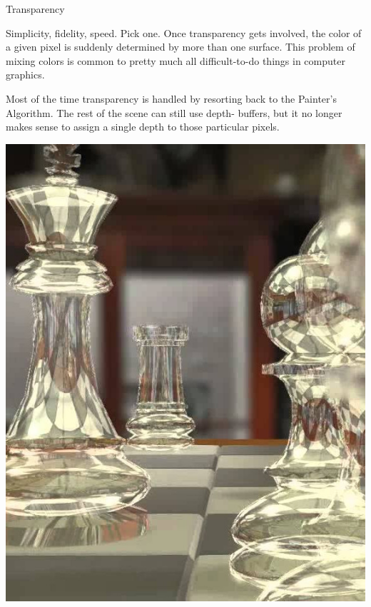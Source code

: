 \documentclass{lug}
\newcommand{\splitslide}[4]{
    \noindent
    \begin{minipage}{#1 \textwidth - #2 }
        #3
    \end{minipage}%
    \hspace{ \dimexpr #2 * 2 \relax }%
    \begin{minipage}{\textwidth - #1 \textwidth - #2 }
        #4
    \end{minipage}
}
\begin{document}
\begin{frame}{Transparency}
    \splitslide{0.65}{.7em}{
        \small

        Simplicity, fidelity, speed. Pick one. Once transparency gets
        involved, the color of a given pixel is suddenly determined by more
        than one surface. This problem of mixing colors is common to pretty
        much all difficult-to-do things in computer graphics.

        \vspace{1ex}

        Most of the time transparency is handled by resorting back to the
        Painter's Algorithm. The rest of the scene can still use depth-%
        buffers, but it no longer makes sense to assign a single depth to
        those particular pixels.

    }{
        \includegraphics[width=\textwidth]{graphics/transparent}
    }
\end{frame}
\end{document}
